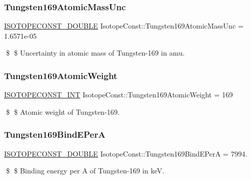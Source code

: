 \subsubsection{\texorpdfstring{Tungsten169\+Atomic\+Mass\+Unc}{Tungsten169AtomicMassUnc}}
{\footnotesize\ttfamily \mbox{\hyperlink{group___isotope_const-_macros_ga8f45a7272ce02c0b4c65c44636ed719a}{I\+S\+O\+T\+O\+P\+E\+C\+O\+N\+S\+T\+\_\+\+D\+O\+U\+B\+LE}} Isotope\+Const\+::\+Tungsten169\+Atomic\+Mass\+Unc = 1.\+6571e-\/05}

\$ \$ Uncertainty in atomic mass of Tungsten-\/169 in amu. \mbox{\label{group___isotope_const-_tungsten-_w169_gaba0fbbb87769dbf27ab37ff8512734f5}} 
\subsubsection{\texorpdfstring{Tungsten169\+Atomic\+Weight}{Tungsten169AtomicWeight}}
{\footnotesize\ttfamily \mbox{\hyperlink{group___isotope_const-_macros_ga5f18360b3e99483a35c32d789e62621c}{I\+S\+O\+T\+O\+P\+E\+C\+O\+N\+S\+T\+\_\+\+I\+NT}} Isotope\+Const\+::\+Tungsten169\+Atomic\+Weight = 169}

\$ \$ Atomic weight of Tungsten-\/169. \mbox{\label{group___isotope_const-_tungsten-_w169_gae2cdfe6cc2355621e4bda3169a960c8b}} 
\subsubsection{\texorpdfstring{Tungsten169\+Bind\+E\+PerA}{Tungsten169BindEPerA}}
{\footnotesize\ttfamily \mbox{\hyperlink{group___isotope_const-_macros_ga8f45a7272ce02c0b4c65c44636ed719a}{I\+S\+O\+T\+O\+P\+E\+C\+O\+N\+S\+T\+\_\+\+D\+O\+U\+B\+LE}} Isotope\+Const\+::\+Tungsten169\+Bind\+E\+PerA = 7994.}

\$ \$ Binding energy per A of Tungsten-\/169 in keV. \mbox{\label{group___isotope_const-_tungsten-_w169_gafcd32792efa53c68f8346dba6945c275}} 
